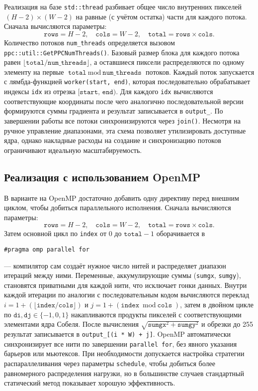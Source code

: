\documentclass[12pt]{article}
\begin{document}
Реализация на базе \texttt{std::thread} разбивает общее число внутренних пикселей \(\,(H-2)\times(W-2)\) на равные (с учётом остатка) части для каждого потока. Сначала вычисляются параметры:
\[
    \texttt{rows} = H - 2,\quad \texttt{cols} = W - 2,\quad \texttt{total} = \texttt{rows} \times \texttt{cols}.
\]
Количество потоков \texttt{num\_threads} определяется вызовом \texttt{ppc::util::GetPPCNumThreads()}. Базовый размер блока для каждого потока равен $\lfloor \texttt{total}/\texttt{num\_threads}\rfloor$, а оставшиеся пиксели распределяются по одному элементу на первые $\texttt{total} \bmod \texttt{num\_threads}$ потоков. Каждый поток запускается с лямбда-функцией \texttt{worker(start, end)}, которая последовательно обрабатывает индексы \texttt{idx} из отрезка \([\texttt{start},\,\texttt{end})\). Для каждого \texttt{idx} вычисляются соответствующие координаты после чего аналогично последовательной версии формируются суммы градиента и результат записывается в \texttt{output\_}. По завершении работы все потоки синхронизируются через \texttt{join()}. Несмотря на ручное управление диапазонами, эта схема позволяет утилизировать доступные ядра, однако накладные расходы на создание и синхронизацию потоков ограничивают идеальную масштабируемость.

\subsection{Реализация с использованием OpenMP}

В варианте на OpenMP достаточно добавить одну директиву перед внешним циклом, чтобы добиться параллельного исполнения. Сначала вычисляются параметры:
\[
    \texttt{rows} = H - 2,\quad \texttt{cols} = W - 2,\quad \texttt{total} = \texttt{rows} \times \texttt{cols}.
\]
Затем основной цикл по \texttt{index} от 0 до \(\texttt{total}-1\) оборачивается в
\begin{verbatim}
#pragma omp parallel for
\end{verbatim}
— компилятор сам создаёт нужное число нитей и распределяет диапазон итераций между ними. Переменные, аккумулирующие суммы (\texttt{sumgx}, \texttt{sumgy}), становятся приватными для каждой нити, что исключает гонки данных. Внутри каждой итерации по аналогии с последовательным кодом вычисляются переклад $i = 1 + (\lfloor \texttt{index}/\texttt{cols}\rfloor)$ и $j = 1 + (\texttt{index} \bmod \texttt{cols})$, затем в двойном цикле по \(\texttt{di}, \texttt{dj} \in \{-1,0,1\}\) накапливаются продукты пикселей с соответствующими элементами ядра Собеля. После вычисления $\sqrt{\texttt{sumgx}^2 + \texttt{sumgy}^2}$ и обрезки до 255 результат записывается в \texttt{output\_[(i * W) + j]}. OpenMP автоматически синхронизирует все нити по завершении \verb|parallel for|, без явного указания барьеров или мьютексов. При необходимости допускается настройка стратегии распараллеливания через параметры \verb|schedule|, чтобы добиться более равномерного распределения нагрузки, но в большинстве случаев стандартный статический метод показывает хорошую эффективность.
\end{document}
